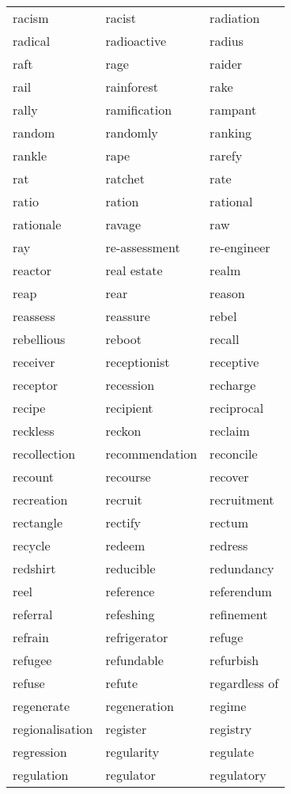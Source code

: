 \documentclass{minimal}
\begin{document}
\begin{longtable}{p{2.7cm}@{\hskip 0.2cm}p{2.7cm}@{\hskip 0.2cm}p{2.7cm}}
racism & racist & radiation \\
radical & radioactive & radius \\
raft & rage & raider \\
rail & rainforest & rake \\
rally & ramification & rampant \\
random & randomly & ranking \\
rankle & rape & rarefy \\
rat & ratchet & rate \\
ratio & ration & rational \\
rationale & ravage & raw \\
ray & re-assessment & re-engineer \\
reactor & real estate & realm \\
reap & rear & reason \\
reassess & reassure & rebel \\
rebellious & reboot & recall \\
receiver & receptionist & receptive \\
receptor & recession & recharge \\
recipe & recipient & reciprocal \\
reckless & reckon & reclaim \\
recollection & recommendation & reconcile \\
recount & recourse & recover \\
recreation & recruit & recruitment \\
rectangle & rectify & rectum \\
recycle & redeem & redress \\
redshirt & reducible & redundancy \\
reel & reference & referendum \\
referral & refeshing & refinement \\
refrain & refrigerator & refuge \\
refugee & refundable & refurbish \\
refuse & refute & regardless of \\
regenerate & regeneration & regime \\
regionalisation & register & registry \\
regression & regularity & regulate \\
regulation & regulator & regulatory \\

\end{longtable}
\end{document}

